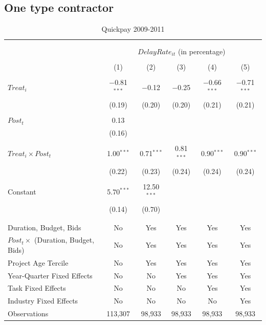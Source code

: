 \documentclass[
]{article}
\begin{document}
\hypertarget{one-type-contractor}{%
\subsection{One type contractor}\label{one-type-contractor}}

\begin{table}[H] \centering 
  \caption{Quickpay 2009-2011} 
  \label{} 
\small 
\begin{tabular}{@{\extracolsep{-2pt}}lccccc} 
\\[-1.8ex]\hline 
\hline \\[-1.8ex] 
\\[-1.8ex] & \multicolumn{5}{c}{$DelayRate_{it}$ (in percentage)} \\ 
\\[-1.8ex] & (1) & (2) & (3) & (4) & (5)\\ 
\hline \\[-1.8ex] 
 $Treat_i$ & $-$0.81$^{***}$ & $-$0.12 & $-$0.25 & $-$0.66$^{***}$ & $-$0.71$^{***}$ \\ 
  & (0.19) & (0.20) & (0.20) & (0.21) & (0.21) \\ 
  & & & & & \\ 
 $Post_t$ & 0.13 &  &  &  &  \\ 
  & (0.16) &  &  &  &  \\ 
  & & & & & \\ 
 $Treat_i \times Post_t$ & 1.00$^{***}$ & 0.71$^{***}$ & 0.81$^{***}$ & 0.90$^{***}$ & 0.90$^{***}$ \\ 
  & (0.22) & (0.23) & (0.24) & (0.24) & (0.24) \\ 
  & & & & & \\ 
 Constant & 5.70$^{***}$ & 12.50$^{***}$ &  &  &  \\ 
  & (0.14) & (0.70) &  &  &  \\ 
  & & & & & \\ 
\hline \\[-1.8ex] 
Duration, Budget, Bids & No & Yes & Yes & Yes & Yes \\ 
$Post_t \times$  (Duration, Budget, Bids) & No & Yes & Yes & Yes & Yes \\ 
Project Age Tercile & No & Yes & Yes & Yes & Yes \\ 
Year-Quarter Fixed Effects & No & No & Yes & Yes & Yes \\ 
Task Fixed Effects & No & No & No & Yes & Yes \\ 
Industry Fixed Effects & No & No & No & No & Yes \\ 
Observations & 113,307 & 98,933 & 98,933 & 98,933 & 98,933 \\ 

\end{tabular}
\end{table}
\end{document}
